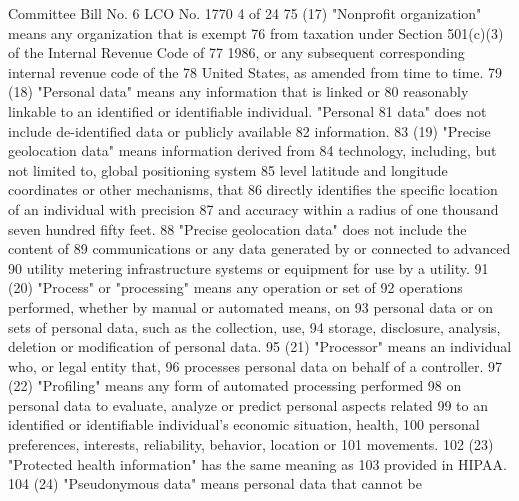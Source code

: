 Committee Bill No. 6
LCO No. 1770 4 of 24
75 (17) "Nonprofit organization" means any organization that is exempt
76 from taxation under Section 501(c)(3) of the Internal Revenue Code of
77 1986, or any subsequent corresponding internal revenue code of the
78 United States, as amended from time to time.
79 (18) "Personal data" means any information that is linked or
80 reasonably linkable to an identified or identifiable individual. "Personal
81 data" does not include de-identified data or publicly available
82 information.
83 (19) "Precise geolocation data" means information derived from
84 technology, including, but not limited to, global positioning system
85 level latitude and longitude coordinates or other mechanisms, that
86 directly identifies the specific location of an individual with precision
87 and accuracy within a radius of one thousand seven hundred fifty feet.
88 "Precise geolocation data" does not include the content of
89 communications or any data generated by or connected to advanced
90 utility metering infrastructure systems or equipment for use by a utility.
91 (20) "Process" or "processing" means any operation or set of
92 operations performed, whether by manual or automated means, on
93 personal data or on sets of personal data, such as the collection, use,
94 storage, disclosure, analysis, deletion or modification of personal data.
95 (21) "Processor" means an individual who, or legal entity that,
96 processes personal data on behalf of a controller.
97 (22) "Profiling" means any form of automated processing performed
98 on personal data to evaluate, analyze or predict personal aspects related
99 to an identified or identifiable individual's economic situation, health,
100 personal preferences, interests, reliability, behavior, location or
101 movements.
102 (23) "Protected health information" has the same meaning as
103 provided in HIPAA.
104 (24) "Pseudonymous data" means personal data that cannot be 

